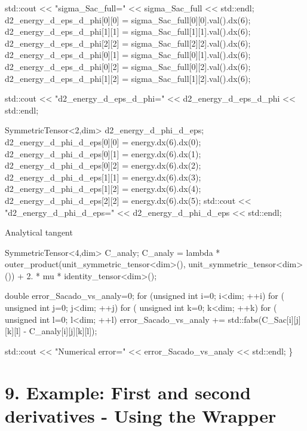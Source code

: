 \begin{DoxyCode}
std::cout << \textcolor{stringliteral}{"sigma\_Sac\_full="} << sigma\_Sac\_full << std::endl;
d2\_energy\_d\_eps\_d\_phi[0][0] = sigma\_Sac\_full[0][0].val().dx(6);
d2\_energy\_d\_eps\_d\_phi[1][1] = sigma\_Sac\_full[1][1].val().dx(6);
d2\_energy\_d\_eps\_d\_phi[2][2] = sigma\_Sac\_full[2][2].val().dx(6);
d2\_energy\_d\_eps\_d\_phi[0][1] = sigma\_Sac\_full[0][1].val().dx(6);
d2\_energy\_d\_eps\_d\_phi[0][2] = sigma\_Sac\_full[0][2].val().dx(6);
d2\_energy\_d\_eps\_d\_phi[1][2] = sigma\_Sac\_full[1][2].val().dx(6);

std::cout << \textcolor{stringliteral}{"d2\_energy\_d\_eps\_d\_phi="} << d2\_energy\_d\_eps\_d\_phi << std::endl;

SymmetricTensor<2,dim> d2\_energy\_d\_phi\_d\_eps;
d2\_energy\_d\_phi\_d\_eps[0][0] = energy.dx(6).dx(0);
d2\_energy\_d\_phi\_d\_eps[0][1] = energy.dx(6).dx(1);
d2\_energy\_d\_phi\_d\_eps[0][2] = energy.dx(6).dx(2);
d2\_energy\_d\_phi\_d\_eps[1][1] = energy.dx(6).dx(3);
d2\_energy\_d\_phi\_d\_eps[1][2] = energy.dx(6).dx(4);
d2\_energy\_d\_phi\_d\_eps[2][2] = energy.dx(6).dx(5);
std::cout << \textcolor{stringliteral}{"d2\_energy\_d\_phi\_d\_eps="} << d2\_energy\_d\_phi\_d\_eps << std::endl;
\end{DoxyCode}
 Analytical tangent 
\begin{DoxyCode}
     SymmetricTensor<4,dim> C\_analy;
     C\_analy = lambda * outer\_product(unit\_symmetric\_tensor<dim>(), unit\_symmetric\_tensor<dim>()) + 2. * mu
       * identity\_tensor<dim>();
 
    \textcolor{keywordtype}{double} error\_Sacado\_vs\_analy=0;
    \textcolor{keywordflow}{for} (\textcolor{keywordtype}{unsigned} \textcolor{keywordtype}{int} i=0; i<dim; ++i)
        \textcolor{keywordflow}{for} ( \textcolor{keywordtype}{unsigned} \textcolor{keywordtype}{int} j=0; j<dim; ++j)
            \textcolor{keywordflow}{for} ( \textcolor{keywordtype}{unsigned} \textcolor{keywordtype}{int} k=0; k<dim; ++k)
                \textcolor{keywordflow}{for} ( \textcolor{keywordtype}{unsigned} \textcolor{keywordtype}{int} l=0; l<dim; ++l)
                    error\_Sacado\_vs\_analy += std::fabs(C\_Sac[i][j][k][l] - C\_analy[i][j][k][l]);
 
    std::cout << \textcolor{stringliteral}{"Numerical error="} << error\_Sacado\_vs\_analy << std::endl;
\}
\end{DoxyCode}
 \hypertarget{index_Ex9}{}\section{9. Example\+: First and second derivatives -\/ Using the Wrapper}\label{index_Ex9}

